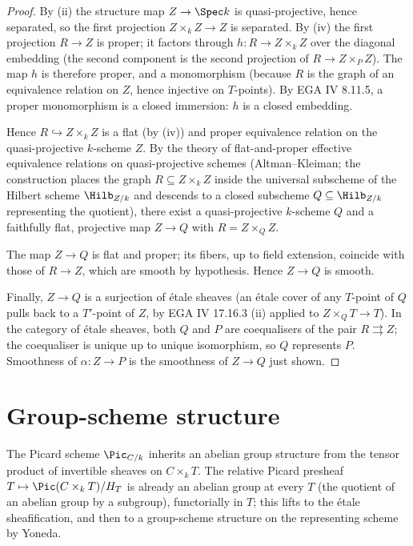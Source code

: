 \begin{proof}
  By (ii) the structure map \(Z \to \Spec k\) is quasi-projective, hence
  separated, so the first projection \(Z \times_k Z \to Z\) is separated.
  By (iv) the first projection \(R \to Z\) is proper; it factors through
  \(h : R \to Z \times_k Z\) over the diagonal embedding (the second
  component is the second projection of \(R \to Z \times_P Z\)). The map
  \(h\) is therefore proper, and a monomorphism (because \(R\) is the graph
  of an equivalence relation on \(Z\), hence injective on \(T\)-points).
  By EGA IV 8.11.5, a proper monomorphism is a closed immersion: \(h\) is a
  closed embedding.

  Hence \(R \hookrightarrow Z \times_k Z\) is a flat (by (iv)) and proper
  equivalence relation on the quasi-projective \(k\)-scheme \(Z\). By the
  theory of flat-and-proper effective equivalence relations on
  quasi-projective schemes (Altman--Kleiman; the construction places
  the graph \(R \subseteq Z \times_k Z\) inside the universal subscheme of
  the Hilbert scheme \(\Hilb_{Z/k}\) and descends to a closed subscheme
  \(Q \subseteq \Hilb_{Z/k}\) representing the quotient), there exist a
  quasi-projective \(k\)-scheme \(Q\) and a faithfully flat, projective map
  \(Z \to Q\) with \(R = Z \times_Q Z\).

  The map \(Z \to Q\) is flat and proper; its fibers, up to field
  extension, coincide with those of \(R \to Z\), which are smooth by
  hypothesis. Hence \(Z \to Q\) is smooth.

  Finally, \(Z \to Q\) is a surjection of \'etale sheaves (an \'etale
  cover of any \(T\)-point of \(Q\) pulls back to a \(T'\)-point of \(Z\), by
  EGA IV 17.16.3 (ii) applied to \(Z \times_Q T \to T\)). In the category
  of \'etale sheaves, both \(Q\) and \(P\) are coequalisers of the pair
  \(R \rightrightarrows Z\); the coequaliser is unique up to unique
  isomorphism, so \(Q\) represents \(P\). Smoothness of \(\alpha : Z \to P\)
  is the smoothness of \(Z \to Q\) just shown.
\end{proof}

\section{Group-scheme structure}
\label{sec:fga_pic_group_structure}

The Picard scheme \(\Pic_{C/k}\) inherits an abelian group structure from
the tensor product of invertible sheaves on \(C \times_k T\). The relative
Picard presheaf \(T \mapsto \Pic(C \times_k T)/H_T\) is already an abelian
group at every \(T\) (the quotient of an abelian group by a subgroup),
functorially in \(T\); this lifts to the \'etale sheafification, and then
to a group-scheme structure on the representing scheme by Yoneda.

